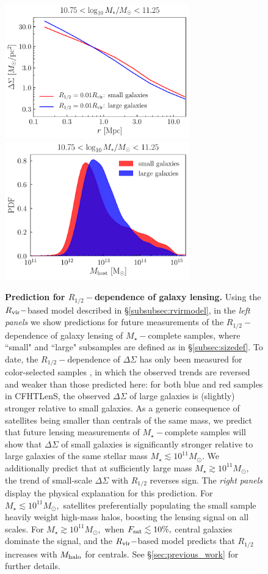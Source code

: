 \documentclass[usenatbib,usegraphicx,letterpaper]{mn2e}
\newcommand{\rhalf}{R_{1/2}}
\newcommand{\mstar}{M_{\star}}
\newcommand{\mhalo}{M_{\rm halo}}
\newcommand{\rvir}{R_{\rm vir}}
\newcommand{\msun}{M_\odot}
\begin{document}
\begin{figure}
\includegraphics[width=8cm]{FIGS/rvir_only_lensing_prediction3.pdf}
\includegraphics[width=8cm]{FIGS/host_mass_distributions_sm10p75_sm11p25.pdf}
\caption{
{\bf Prediction for $\rhalf-$dependence of galaxy lensing.}
Using the $\rvir-$based model described in \S\ref{subsubsec:rvirmodel}, in the {\em left panels} we show predictions for future measurements of the $\rhalf-$dependence of galaxy lensing of $\mstar-$complete samples, where ``small" and ``large" subsamples are defined as in \S\ref{subsec:sizedef}. To date, the $\rhalf-$dependence of $\Delta\Sigma$ has only been measured for color-selected samples \citep{charlton_etal17}, in which the observed trends are reversed and weaker than those predicted here: for both blue and red samples in CFHTLenS, the observed $\Delta\Sigma$ of large galaxies is (slightly) stronger relative to small galaxies. As a generic consequence of satellites being smaller than centrals of the same mass, we predict that future lensing measurements of $\mstar-$complete samples will show that $\Delta\Sigma$ of small galaxies is significantly stronger relative to large galaxies of the same stellar mass $\mstar\lesssim10^{11}\msun.$ We additionally predict that at sufficiently large mass $\mstar\gtrsim10^{11}\msun,$ the trend of small-scale $\Delta\Sigma$ with $\rhalf$ reverses sign. The {\em right panels} display the physical explanation for this prediction. For $\mstar\lesssim10^{11}\msun,$ satellites preferentially populating the small sample heavily weight high-mass halos, boosting the lensing signal on all scales. For $\mstar\gtrsim10^{11}\msun,$ when $F_{\rm sat}\lesssim10\%,$ central galaxies dominate the signal, and the $\rvir-$based model predicts that $\rhalf$ increases with $\mhalo$ for centrals. See \S\ref{sec:previous_work} for further details.
}
\label{fig:lensingprediction}
\end{figure}
\end{document}
